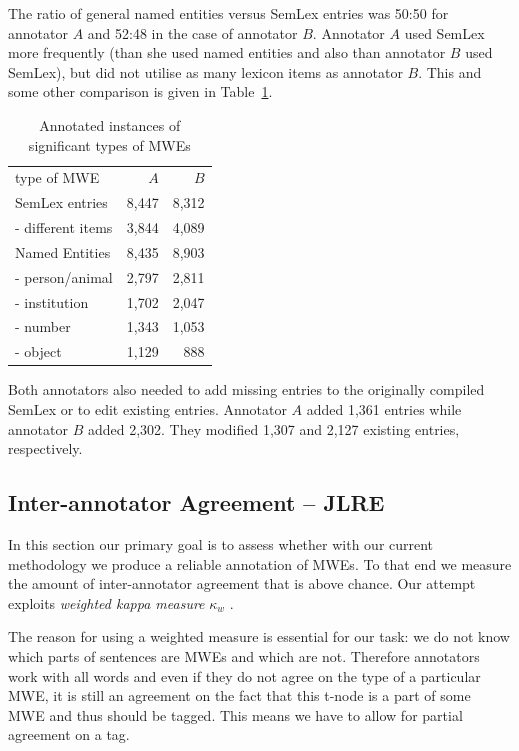 The ratio of general named entities versus SemLex entries was 50:50 for annotator $A$ and 52:48 in the case of annotator $B$. Annotator $A$ used SemLex more frequently (than she used named entities and also than annotator $B$ used SemLex), but did not utilise as many lexicon items as annotator $B$.
This and some other comparison is given in Table~\ref{tab:anot}.


\begin{table}[h]
\centering
\begin{tabular}{l|r|r}
type of MWE&$A$&$B$\\
\cline{1-3}
SemLex entries&8,447&8,312\\
 - different items&3,844&4,089\\
Named Entities&8,435&8,903\\
 - person/animal&2,797&2,811\\
 - institution&1,702&2,047\\
 - number&1,343&1,053\\
 - object&1,129&888\\
\end{tabular}
\caption{Annotated instances of significant types of MWEs }
\label{tab:anot}
\end{table}

Both annotators also needed to add missing entries to the originally compiled SemLex or to edit existing entries. Annotator $A$ added 1,361 entries while annotator $B$ added 2,302. They modified 1,307 and 2,127 existing entries, respectively.


\subsection{Inter-annotator Agreement – JLRE}
\label{agreement}

In this section our primary goal is to assess whether with our current methodology we produce a reliable annotation of MWEs. To that end we measure the amount of inter-annotator agreement that is above chance. Our attempt exploits {\it weighted kappa measure} $\kappa_w$ \cite{cohen:1968}.

The reason for using a weighted measure is essential for our task: we do not know which parts of sentences are MWEs and which are not. Therefore annotators work with all words and even if they do not agree on the type of a particular MWE, it is still an agreement on the fact that this t-node is a part of some MWE and thus should be tagged. This means we have to allow for partial agreement on a tag.

